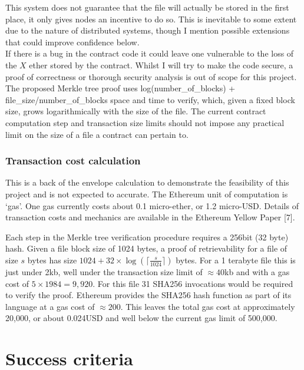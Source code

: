 \documentclass[oneside]{article}
\begin{document}
This system does not guarantee that the file will actually be stored in the first place, it only gives nodes an incentive to do so.
This is inevitable to some extent due to the nature of distributed systems, though I mention possible extensions that could improve confidence below.\\

If there is a bug in the contract code it could leave one vulnerable to the loss of the $X$ ether stored by the contract.
Whilst I will try to make the code secure, a proof of correctness or thorough security analysis is out of scope for this project.\\

The proposed Merkle tree proof uses log(number\_of\_blocks) + file\_size/number\_of\_blocks space and time to verify, which,
given a fixed block size, grows logarithmically with the size of the file.
The current contract computation step and transaction size limits should not impose any practical limit on the size of a file a contract can pertain to.

\subsubsection{Transaction cost calculation}
This is a back of the envelope calculation to demonstrate the feasibility of this project and is not expected to accurate.
The Ethereum unit of computation is `gas'. One gas currently costs about 0.1 micro-ether, or 1.2 micro-USD.
Details of transaction costs and mechanics are available in the Ethereum Yellow Paper [7].

Each step in the Merkle tree verification procedure requires a 256bit (32 byte) hash.
Given a file block size of 1024 bytes, a proof of retrievability for a file of size $s$ bytes has size $1024 + 32 \times \log(\lceil \frac{s}{1024}\rceil)$ bytes.
For a 1 terabyte file this is just under 2kb, well under the transaction size limit of $\approx 40$kb and with a gas cost of $5 \times 1984 = 9,920$.
For this file 31 SHA256 invocations would be required to verify the proof. Ethereum provides the SHA256 hash function as part of its language at a gas cost of $\approx 200$.
This leaves the total gas cost at approximately 20,000, or about 0.024USD and well below the current gas limit of 500,000.


\section{Success criteria}
\end{document}
